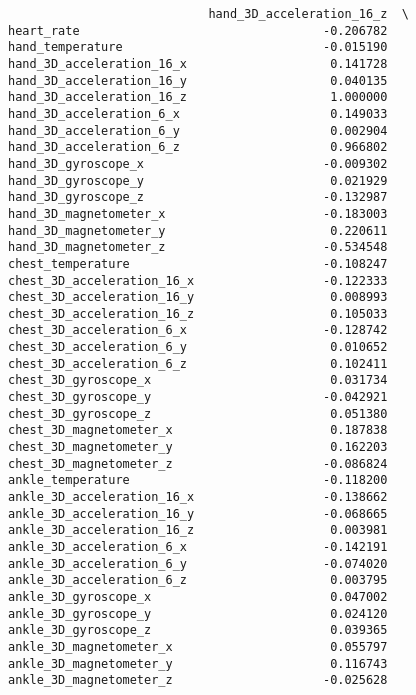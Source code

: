 \documentclass[11pt]{article}
\begin{document}
\begin{verbatim}
                            hand_3D_acceleration_16_z  \
heart_rate                                  -0.206782   
hand_temperature                            -0.015190   
hand_3D_acceleration_16_x                    0.141728   
hand_3D_acceleration_16_y                    0.040135   
hand_3D_acceleration_16_z                    1.000000   
hand_3D_acceleration_6_x                     0.149033   
hand_3D_acceleration_6_y                     0.002904   
hand_3D_acceleration_6_z                     0.966802   
hand_3D_gyroscope_x                         -0.009302   
hand_3D_gyroscope_y                          0.021929   
hand_3D_gyroscope_z                         -0.132987   
hand_3D_magnetometer_x                      -0.183003   
hand_3D_magnetometer_y                       0.220611   
hand_3D_magnetometer_z                      -0.534548   
chest_temperature                           -0.108247   
chest_3D_acceleration_16_x                  -0.122333   
chest_3D_acceleration_16_y                   0.008993   
chest_3D_acceleration_16_z                   0.105033   
chest_3D_acceleration_6_x                   -0.128742   
chest_3D_acceleration_6_y                    0.010652   
chest_3D_acceleration_6_z                    0.102411   
chest_3D_gyroscope_x                         0.031734   
chest_3D_gyroscope_y                        -0.042921   
chest_3D_gyroscope_z                         0.051380   
chest_3D_magnetometer_x                      0.187838   
chest_3D_magnetometer_y                      0.162203   
chest_3D_magnetometer_z                     -0.086824   
ankle_temperature                           -0.118200   
ankle_3D_acceleration_16_x                  -0.138662   
ankle_3D_acceleration_16_y                  -0.068665   
ankle_3D_acceleration_16_z                   0.003981   
ankle_3D_acceleration_6_x                   -0.142191   
ankle_3D_acceleration_6_y                   -0.074020   
ankle_3D_acceleration_6_z                    0.003795   
ankle_3D_gyroscope_x                         0.047002   
ankle_3D_gyroscope_y                         0.024120   
ankle_3D_gyroscope_z                         0.039365   
ankle_3D_magnetometer_x                      0.055797   
ankle_3D_magnetometer_y                      0.116743   
ankle_3D_magnetometer_z                     -0.025628   


\end{verbatim}
\end{document}
